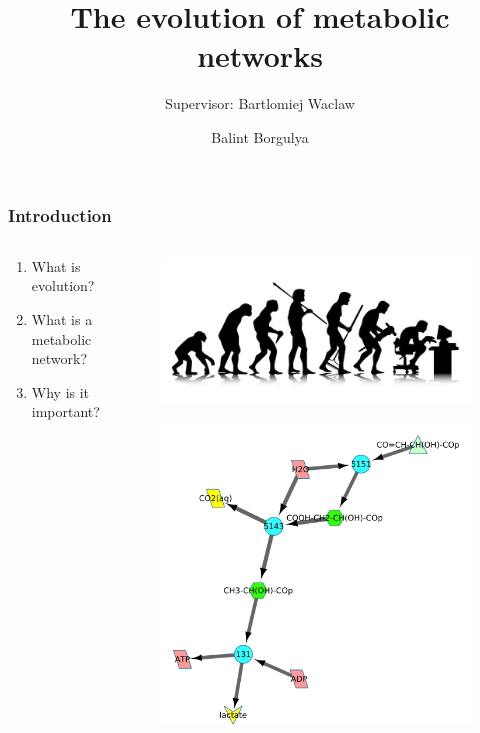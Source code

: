 \documentclass[11pt]{beamer}
\author{Balint Borgulya}
\title{The evolution of metabolic networks}
\subtitle{Supervisor: Bartlomiej Waclaw}
\begin{document}
	\maketitle
	
	\begin{frame}
		\frametitle{Introduction}
		\begin{columns}

			\begin{column}{0.5\textwidth}
				\begin{enumerate}
					\item What is evolution? 
					\item What is a metabolic network?
					\item Why is it important?
				\end{enumerate}
			\end{column}
			\begin{column}{0.5\textwidth}
				\begin{figure}
				\centering
				\includegraphics[width=1\linewidth]{evolution}
				\label{fig:evolution}
				\end{figure}
				
					\begin{figure}
						\centering
						\includegraphics[width=0.9\linewidth]{initial_network}
						

\end{figure}
\end{column}
\end{columns}
\end{frame}
\end{document}
